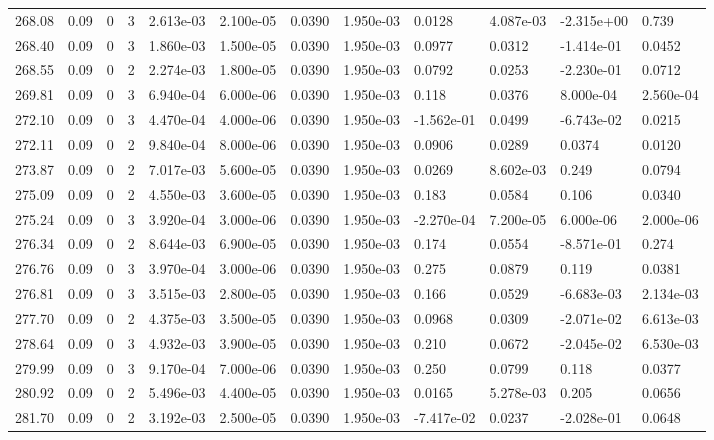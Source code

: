 \documentclass[preview]{standalone}
\begin{document}
{{{{{{{{{\begin{tabular}{L{1.2cm}C{1.2cm} C{0.3cm}C{0.5cm} C{1.4cm}C{1.4cm} C{1.4cm}C{1.4cm} C{1.6cm}C{1.6cm} C{1.6cm}C{1.6cm}}
  268.08  &  0.09  & 0     &  3 &  2.613e-03  & 2.100e-05  &  0.0390&   1.950e-03& 0.0128 & 4.087e-03   &  -2.315e+00 & 0.739  \\ 
  268.40  &  0.09  & 0     &  3 &  1.860e-03  & 1.500e-05  &  0.0390&   1.950e-03& 0.0977 & 0.0312   &  -1.414e-01 & 0.0452  \\ 
  268.55  &  0.09  & 0     &  2 &  2.274e-03  & 1.800e-05  &  0.0390&   1.950e-03& 0.0792 & 0.0253   &  -2.230e-01 & 0.0712  \\ 
  269.81  &  0.09  & 0     &  3 &  6.940e-04  & 6.000e-06  &  0.0390&   1.950e-03& 0.118 & 0.0376   &  8.000e-04 & 2.560e-04  \\ 
  272.10  &  0.09  & 0     &  3 &  4.470e-04  & 4.000e-06  &  0.0390&   1.950e-03& -1.562e-01 & 0.0499   &  -6.743e-02 & 0.0215  \\ 
  272.11  &  0.09  & 0     &  2 &  9.840e-04  & 8.000e-06  &  0.0390&   1.950e-03& 0.0906 & 0.0289   &  0.0374 & 0.0120  \\ 
  273.87  &  0.09  & 0     &  2 &  7.017e-03  & 5.600e-05  &  0.0390&   1.950e-03& 0.0269 & 8.602e-03   &  0.249 & 0.0794  \\ 
  275.09  &  0.09  & 0     &  2 &  4.550e-03  & 3.600e-05  &  0.0390&   1.950e-03& 0.183 & 0.0584   &  0.106 & 0.0340  \\ 
  275.24  &  0.09  & 0     &  3 &  3.920e-04  & 3.000e-06  &  0.0390&   1.950e-03& -2.270e-04 & 7.200e-05   &  6.000e-06 & 2.000e-06  \\ 
  276.34  &  0.09  & 0     &  2 &  8.644e-03  & 6.900e-05  &  0.0390&   1.950e-03& 0.174 & 0.0554   &  -8.571e-01 & 0.274  \\ 
  276.76  &  0.09  & 0     &  3 &  3.970e-04  & 3.000e-06  &  0.0390&   1.950e-03& 0.275 & 0.0879   &  0.119 & 0.0381  \\ 
  276.81  &  0.09  & 0     &  3 &  3.515e-03  & 2.800e-05  &  0.0390&   1.950e-03& 0.166 & 0.0529   &  -6.683e-03 & 2.134e-03  \\ 
  277.70  &  0.09  & 0     &  2 &  4.375e-03  & 3.500e-05  &  0.0390&   1.950e-03& 0.0968 & 0.0309   &  -2.071e-02 & 6.613e-03  \\ 
  278.64  &  0.09  & 0     &  3 &  4.932e-03  & 3.900e-05  &  0.0390&   1.950e-03& 0.210 & 0.0672   &  -2.045e-02 & 6.530e-03  \\ 
  279.99  &  0.09  & 0     &  3 &  9.170e-04  & 7.000e-06  &  0.0390&   1.950e-03& 0.250 & 0.0799   &  0.118 & 0.0377  \\ 
  280.92  &  0.09  & 0     &  2 &  5.496e-03  & 4.400e-05  &  0.0390&   1.950e-03& 0.0165 & 5.278e-03   &  0.205 & 0.0656  \\ 
  281.70  &  0.09  & 0     &  2 &  3.192e-03  & 2.500e-05  &  0.0390&   1.950e-03& -7.417e-02 & 0.0237   &  -2.028e-01 & 0.0648  \\ 
\hline 
\end{tabular} 

}}}}}}}}}
\end{document}
